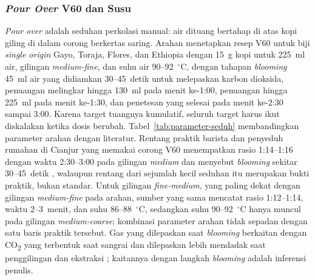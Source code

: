 \subsubsection{\texorpdfstring{\textit{Pour Over}}{Pour Over} V60 dan Susu}
\label{subsubsec:v60}

\textit{Pour over} adalah seduhan perkolasi manual: air dituang bertahap di atas kopi giling di dalam corong berkertas saring. Arahan menetapkan resep V60 untuk biji \textit{single origin} Gayo, Toraja, Flores, dan Ethiopia dengan 15~g kopi untuk 225~ml air, gilingan \textit{medium-fine}, dan suhu air 90--92~$^\circ$C, dengan tahapan \textit{blooming} 45~ml air yang didiamkan 30--45~detik untuk melepaskan karbon dioksida, penuangan melingkar hingga 130~ml pada menit ke-1:00, penuangan hingga 225~ml pada menit ke-1:30, dan penetesan yang selesai pada menit ke-2:30 sampai 3:00. Karena target tuangnya kumulatif, seluruh target harus ikut diskalakan ketika dosis berubah. Tabel~\ref{tab:parameter-seduh} membandingkan parameter arahan dengan literatur. Rentang praktik barista dan penyeduh rumahan di Cianjur yang memakai corong V60 menempatkan rasio 1:14--1:16 dengan waktu 2:30--3:00 pada gilingan \textit{medium} dan menyebut \textit{blooming} sekitar 30--45~detik \citep*{bramantoro2025optimization}, walaupun rentang dari sejumlah kecil seduhan itu merupakan bukti praktik, bukan standar. Untuk gilingan \textit{fine-medium}, yang paling dekat dengan gilingan \textit{medium-fine} pada arahan, sumber yang sama mencatat rasio 1:12--1:14, waktu 2--3~menit, dan suhu 86--88~$^\circ$C, sedangkan suhu 90--92~$^\circ$C hanya muncul pada gilingan \textit{medium-coarse}; kombinasi parameter arahan tidak sepadan dengan satu baris praktik tersebut. Gas yang dilepaskan saat \textit{blooming} berkaitan dengan CO\textsubscript{2} yang terbentuk saat sangrai dan dilepaskan lebih mendadak saat penggilingan dan ekstraksi \citep{smrke2017timeresolved}; kaitannya dengan langkah \textit{blooming} adalah inferensi penulis.

